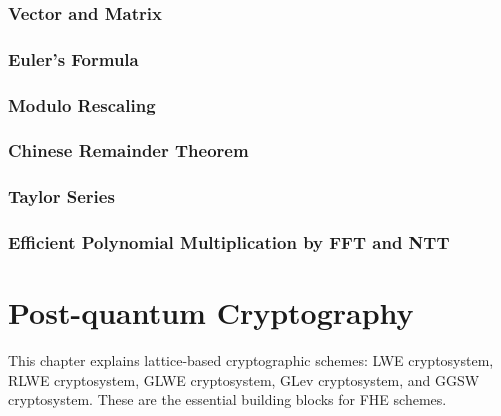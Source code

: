 \documentclass[11pt]{article}
\begin{document}
\clearpage

\section{Vector and Matrix}
\label{sec:matrix}


\clearpage

\section{Euler's Formula}
\label{sec:euler}


\clearpage

\section{Modulo Rescaling}
\label{sec:modulus-rescaling}


\clearpage

\section{Chinese Remainder Theorem}
\label{sec:chinese-remainder}


\clearpage

\section{Taylor Series}
\label{sec:taylor-series}


\clearpage



\section{Efficient Polynomial Multiplication by FFT and NTT}
\label{sec:ntt}


\clearpage





\part{Post-quantum Cryptography}
\label{part:pqc}

\renewcommand{\thesection}{B-\arabic{section}}
\setcounter{section}{0}

This chapter explains lattice-based cryptographic schemes: LWE cryptosystem, RLWE cryptosystem, GLWE cryptosystem, GLev cryptosystem, and GGSW cryptosystem. These are the essential building blocks for FHE schemes. 
\end{document}
